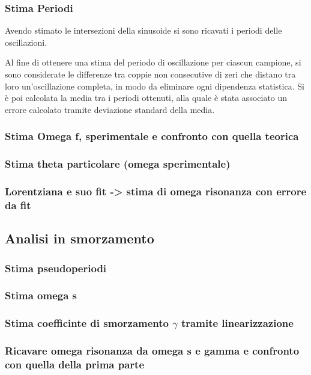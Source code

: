 \documentclass[a4paper,11pt,oneside]{article}
\begin{document}
\subsubsection{Stima Periodi}
Avendo stimato le intersezioni della sinusoide si sono ricavati i periodi delle oscillazioni. 

Al fine di ottenere una stima del periodo di oscillazione per ciascun campione, si sono considerate le differenze tra coppie non consecutive di zeri che distano tra loro un'oscillazione completa, in modo da eliminare ogni dipendenza statistica.
Si è poi calcolata la media tra i periodi ottenuti, alla quale è stata associato un errore calcolato tramite deviazione standard della media.



\subsubsection{Stima Omega f, sperimentale e confronto con quella teorica}
\subsubsection{Stima theta particolare (omega sperimentale)}
\subsubsection{Lorentziana e suo fit -> stima di omega risonanza con errore da fit}

\subsection{Analisi in smorzamento}
\subsubsection{Stima pseudoperiodi}
\subsubsection{Stima omega s }
\subsubsection{Stima coefficinte di smorzamento $\gamma$ tramite linearizzazione}
\subsubsection{Ricavare omega risonanza da omega s e gamma e confronto con quella della prima parte}
\end{document}
